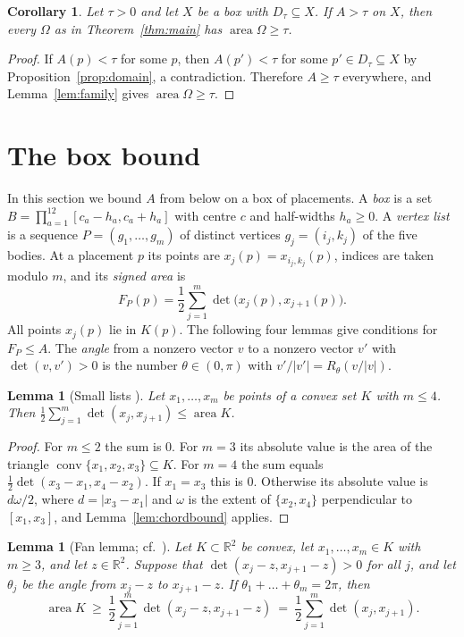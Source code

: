 \documentclass[11pt]{amsart}
\newtheorem{lemma}[theorem]{Lemma}
\newtheorem{corollary}[theorem]{Corollary}
\theoremstyle{definition}
\theoremstyle{remark}
\numberwithin{equation}{section}
\newcommand{\R}{\mathbb{R}}
\newcommand{\area}{\operatorname{area}}
\newcommand{\conv}{\operatorname{conv}}
\begin{document}
\begin{corollary}\label{cor:root}
Let $\tau>0$ and let $X$ be a box with $D_\tau\subseteq X$. If $A>\tau$ on $X$, then every $\Omega$ as in Theorem~\textup{\ref{thm:main}} has $\area\Omega\ge\tau$.
\end{corollary}

\begin{proof}
If $A(p)<\tau$ for some $p$, then $A(p')<\tau$ for some $p'\in D_\tau\subseteq X$ by Proposition~\ref{prop:domain}, a contradiction. Therefore $A\ge\tau$ everywhere, and Lemma~\ref{lem:family} gives $\area\Omega\ge\tau$.
\end{proof}

\section{The box bound}\label{sec:box}

In this section we bound $A$ from below on a box of placements. A \emph{box} is a set $B=\prod_{a=1}^{12}[c_a-h_a,c_a+h_a]$ with centre $c$ and half-widths $h_a\ge0$. A \emph{vertex list} is a sequence $P=(g_1,\dots,g_m)$ of distinct vertices $g_j=(i_j,k_j)$ of the five bodies. At a placement $p$ its points are $x_j(p)=x_{i_j,k_j}(p)$, indices are taken modulo $m$, and its \emph{signed area} is
\[
F_P(p)=\frac12\sum_{j=1}^m\det\bigl(x_j(p),x_{j+1}(p)\bigr).
\]
All points $x_j(p)$ lie in $K(p)$. The following four lemmas give conditions for $F_P\le A$. The \emph{angle} from a nonzero vector $v$ to a nonzero vector $v'$ with $\det(v,v')>0$ is the number $\theta\in(0,\pi)$ with $v'/|v'|=R_\theta(v/|v|)$.

\begin{lemma}[Small lists {\cite[Lemma~3.3]{Kel26}}]\label{lem:small}
Let $x_1,\dots,x_m$ be points of a convex set $K$ with $m\le4$. Then $\frac12\sum_{j=1}^m\det(x_j,x_{j+1})\le\area K$.
\end{lemma}

\begin{proof}
For $m\le2$ the sum is $0$. For $m=3$ its absolute value is the area of the triangle $\conv\{x_1,x_2,x_3\}\subseteq K$. For $m=4$ the sum equals $\frac12\det(x_3-x_1,x_4-x_2)$. If $x_1=x_3$ this is $0$. Otherwise its absolute value is $d\omega/2$, where $d=|x_3-x_1|$ and $\omega$ is the extent of $\{x_2,x_4\}$ perpendicular to $[x_1,x_3]$, and Lemma~\ref{lem:chordbound} applies.
\end{proof}

\begin{lemma}[Fan lemma; cf.\ {\cite[Lemma~3.1]{Tom26}}]\label{lem:fan}
Let $K\subset\R^2$ be convex, let $x_1,\dots,x_m\in K$ with $m\ge3$, and let $z\in\R^2$. Suppose that $\det(x_j-z,x_{j+1}-z)>0$ for all $j$, and let $\theta_j$ be the angle from $x_j-z$ to $x_{j+1}-z$. If $\theta_1+\dots+\theta_m=2\pi$, then
\[
\area K\ \ge\ \frac12\sum_{j=1}^m\det(x_j-z,x_{j+1}-z)\ =\ \frac12\sum_{j=1}^m\det(x_j,x_{j+1}).
\]
\end{lemma}
\end{document}
